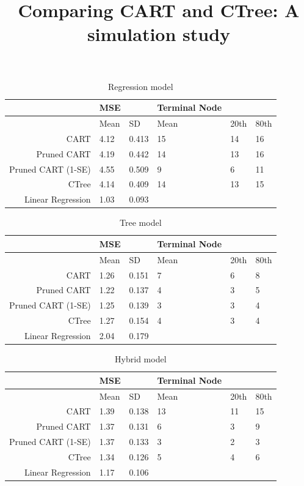 \documentclass{article}
\title{Comparing CART and CTree: A simulation study}
\begin{document}


\maketitle


\begin{table}[ht]
\centering
\begin{tabular}{rlllll}
  \hline
 & MSE &  & Terminal Node &  &  \\ 
  \hline
 & Mean & SD & Mean & 20th & 80th \\ 
  CART & 4.12 & 0.413 & 15 & 14 & 16 \\ 
  Pruned CART & 4.19 & 0.442 & 14 & 13 & 16 \\ 
  Pruned CART (1-SE) & 4.55 & 0.509 & 9 & 6 & 11 \\ 
  CTree & 4.14 & 0.409 & 14 & 13 & 15 \\ 
  Linear Regression & 1.03 & 0.093 &  &  &  \\ 
   \hline
\end{tabular}
\caption{Regression model} 
\end{table}

\begin{table}[ht]
\centering
\begin{tabular}{rlllll}
  \hline
 & MSE &  & Terminal Node &  &  \\ 
  \hline
 & Mean & SD & Mean & 20th & 80th \\ 
  CART & 1.26 & 0.151 & 7 & 6 & 8 \\ 
  Pruned CART & 1.22 & 0.137 & 4 & 3 & 5 \\ 
  Pruned CART (1-SE) & 1.25 & 0.139 & 3 & 3 & 4 \\ 
  CTree & 1.27 & 0.154 & 4 & 3 & 4 \\ 
  Linear Regression & 2.04 & 0.179 &  &  &  \\ 
   \hline
\end{tabular}
\caption{ Tree model} 
\end{table}

\begin{table}[ht]
\centering
\begin{tabular}{rlllll}
  \hline
 & MSE &  & Terminal Node &  &  \\ 
  \hline
 & Mean & SD & Mean & 20th & 80th \\ 
  CART & 1.39 & 0.138 & 13 & 11 & 15 \\ 
  Pruned CART & 1.37 & 0.131 & 6 & 3 & 9 \\ 
  Pruned CART (1-SE) & 1.37 & 0.133 & 3 & 2 & 3 \\ 
  CTree & 1.34 & 0.126 & 5 & 4 & 6 \\ 
  Linear Regression & 1.17 & 0.106 &  &  &  \\ 
   \hline
\end{tabular}
\caption{Hybrid model} 
\end{table}
\end{document}
